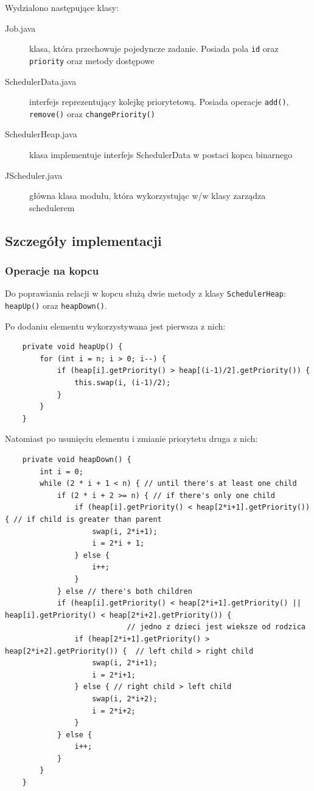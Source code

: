 \documentclass[12pt,a4paper]{article}
\begin{document}
Wydzialono następujące klasy:

\begin{description}
	\item [Job.java] klasa, która przechowuje pojedyncze zadanie. Posiada pola \texttt{id} oraz \texttt{priority} oraz metody dostępowe
	\item [SchedulerData.java] interfejs reprezentujący kolejkę priorytetową. Posiada operacje \texttt{add()}, \texttt{remove()} oraz \texttt{changePriority()}
	\item [SchedulerHeap.java] klasa implementuje interfejs SchedulerData w postaci kopca binarnego
	\item [JScheduler.java] główna klasa modułu, która wykorzystując w/w klasy zarządza schedulerem
\end{description}

\subsection{Szczegóły implementacji}

\subsubsection{Operacje na kopcu}

Do poprawiania relacji w kopcu służą dwie metody z klasy \texttt{SchedulerHeap}: \texttt{heapUp()} oraz \texttt{heapDown()}.

Po dodaniu elementu wykorzystywana jest pierwsza z nich:

\begin{lstlisting}
    private void heapUp() {
        for (int i = n; i > 0; i--) {
            if (heap[i].getPriority() > heap[(i-1)/2].getPriority()) {
                this.swap(i, (i-1)/2);
            }
        }
    }
\end{lstlisting}

Natomiast po usunięciu elementu i zmianie priorytetu druga z nich:

\begin{lstlisting}
    private void heapDown() {
        int i = 0;
        while (2 * i + 1 < n) { // until there's at least one child
            if (2 * i + 2 >= n) { // if there's only one child
                if (heap[i].getPriority() < heap[2*i+1].getPriority()) { // if child is greater than parent
                    swap(i, 2*i+1);
                    i = 2*i + 1;
                } else {
                    i++;
                }
            } else // there's both children
            if (heap[i].getPriority() < heap[2*i+1].getPriority() || heap[i].getPriority() < heap[2*i+2].getPriority()) {
							// jedno z dzieci jest wieksze od rodzica
                if (heap[2*i+1].getPriority() > heap[2*i+2].getPriority()) {  // left child > right child
                    swap(i, 2*i+1);
                    i = 2*i+1;
                } else { // right child > left child
                    swap(i, 2*i+2);
                    i = 2*i+2;
                }
            } else {
                i++;
            }
        }
    }
\end{lstlisting}
\end{document}
